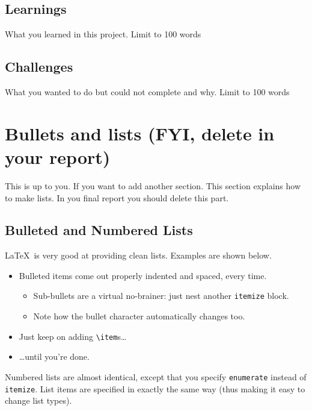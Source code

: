 \documentclass{article}
\begin{document}
\subsection{Learnings}

What you learned in this project. Limit to 100 words

\subsection{Challenges}

What you wanted to do but could not complete and why. Limit to 100 words




\section{Bullets and lists (FYI, delete in your report)}

This is up to you. If you want to add another section. This section explains how to make lists. In you final report you should delete this part. 

\subsection{Bulleted and Numbered Lists}

\LaTeX\ is very good at providing clean lists.  Examples are shown below.

\begin{itemize}
\item Bulleted items come out properly indented and spaced, every time.

\begin{itemize}
\item Sub-bullets are a virtual no-brainer: just nest another \verb!itemize! block.
\item Note how the bullet character automatically changes too.
\end{itemize}

\item Just keep on adding \verb!\item!s\ldots

\item \ldots until you're done.
\end{itemize}

Numbered lists are almost identical, except that you specify \verb!enumerate! instead of \verb!itemize!.  List items are specified in exactly the same way (thus making it easy to change list types).
\end{document}
